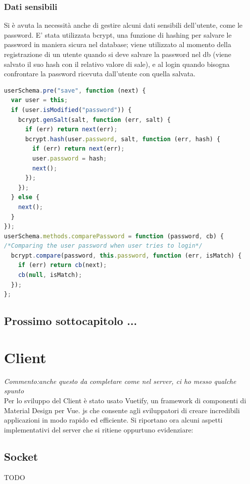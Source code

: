 \subsubsection{Dati sensibili}
Si è avuta la necessità anche di gestire alcuni dati sensibili dell'utente, come le password. E' stata utilizzata bcrypt, una funzione di hashing per salvare le password in maniera sicura
nel database; viene utilizzato al momento della registrazione di un utente
quando si deve salvare la password nel db (viene salvato il suo hash con il
relativo valore di sale), e al login quando bisogna confrontare la password
ricevuta dall’utente con quella salvata. 
\begin{lstlisting}[language=Javascript]
userSchema.pre("save", function (next) {
  var user = this;
  if (user.isModified("password")) {
    bcrypt.genSalt(salt, function (err, salt) {
      if (err) return next(err);
      bcrypt.hash(user.password, salt, function (err, hash) {
        if (err) return next(err);
        user.password = hash;
        next();
      });
    });
  } else {
    next();
  }
});
userSchema.methods.comparePassword = function (password, cb) {
/*Comparing the user password when user tries to login*/
  bcrypt.compare(password, this.password, function (err, isMatch) {
    if (err) return cb(next);
    cb(null, isMatch);
  });
};
\end{lstlisting}

\subsection{Prossimo sottocapitolo ...}


\section{Client}
\textit{Commento:anche questo da completare come nel server, ci ho messo qualche spunto}\\
Per lo sviluppo del Client è stato usato Vuetify, un framework di componenti di Material Design per Vue. js che consente agli sviluppatori di creare incredibili applicazioni in modo rapido ed efficiente.
Si riportano ora alcuni aspetti implementativi del server che si ritiene oppurtuno evidenziare: 
\subsection{Socket}
TODO

